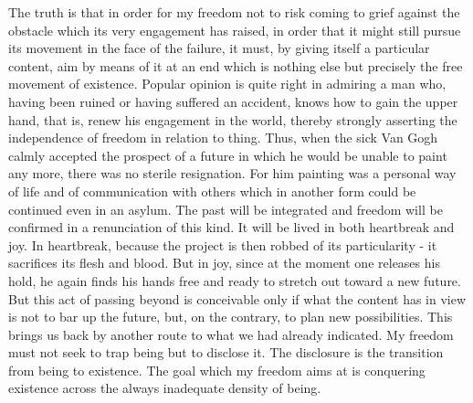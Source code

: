\documentclass[11pt]{article}
\begin{document}
The truth is that in order for my freedom not to risk coming to grief against the obstacle which its very engagement has raised, in order that it might still pursue its movement in the face of the failure, it must, by giving itself a particular content, aim by means of it at an end which is nothing else but precisely the free movement of existence. Popular opinion is quite right in admiring a man who, having been ruined or having suffered an accident, knows how to gain the upper hand, that is, renew his engagement in the world, thereby strongly asserting the independence of freedom in relation to thing. Thus, when the sick Van Gogh calmly accepted the prospect of a future in which he would be unable to paint any more, there was no sterile resignation. For him painting was a personal way of life and of communication with others which in another form could be continued even in an asylum. The past will be integrated and freedom will be confirmed in a renunciation of this kind. It will be lived in both heartbreak and joy. In heartbreak, because the project is then robbed of its particularity - it sacrifices its flesh and blood. But in joy, since at the moment one releases his hold, he again finds his hands free and ready to stretch out toward a new future. But this act of passing beyond is conceivable only if what the content has in view is not to bar up the future, but, on the contrary, to plan new possibilities. This brings us back by another route to what we had already indicated. My freedom must not seek to trap being but to disclose it. The disclosure is the transition from being to existence. The goal which my freedom aims at is conquering existence across the always inadequate density of being.
\end{document}
